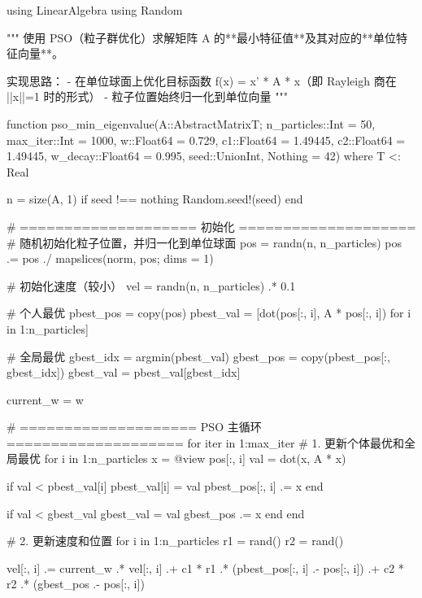 \begin{jllisting}[language={julia}, caption={PSO求解矩阵特征值及其单位特征向量}, label=code:grok]
using LinearAlgebra
using Random

"""
使用 PSO（粒子群优化）求解矩阵 A 的**最小特征值**及其对应的**单位特征向量**。

实现思路：
- 在单位球面上优化目标函数 f(x) = x' * A * x（即 Rayleigh 商在 ||x||=1 时的形式）
- 粒子位置始终归一化到单位向量
"""

function pso_min_eigenvalue(A::AbstractMatrix{T};
                            n_particles::Int = 50,
                            max_iter::Int = 1000,
                            w::Float64 = 0.729,
                            c1::Float64 = 1.49445,
                            c2::Float64 = 1.49445,
                            w_decay::Float64 = 0.995,
                            seed::Union{Int, Nothing} = 42) where T <: Real

    n = size(A, 1)
    if seed !== nothing
        Random.seed!(seed)
    end

    # ==================== 初始化 ====================
    # 随机初始化粒子位置，并归一化到单位球面
    pos = randn(n, n_particles)
    pos .= pos ./ mapslices(norm, pos; dims = 1)

    # 初始化速度（较小）
    vel = randn(n, n_particles) .* 0.1

    # 个人最优
    pbest_pos = copy(pos)
    pbest_val = [dot(pos[:, i], A * pos[:, i]) for i in 1:n_particles]

    # 全局最优
    gbest_idx = argmin(pbest_val)
    gbest_pos = copy(pbest_pos[:, gbest_idx])
    gbest_val = pbest_val[gbest_idx]

    current_w = w

    # ==================== PSO 主循环 ====================
    for iter in 1:max_iter
        # 1. 更新个体最优和全局最优
        for i in 1:n_particles
            x = @view pos[:, i]
            val = dot(x, A * x)

            if val < pbest_val[i]
                pbest_val[i] = val
                pbest_pos[:, i] .= x
            end

            if val < gbest_val
                gbest_val = val
                gbest_pos .= x
            end
        end

        # 2. 更新速度和位置
        for i in 1:n_particles
            r1 = rand()
            r2 = rand()

            vel[:, i] .= current_w .* vel[:, i] .+
                         c1 * r1 .* (pbest_pos[:, i] .- pos[:, i]) .+
                         c2 * r2 .* (gbest_pos .- pos[:, i])


\end{jllisting}
